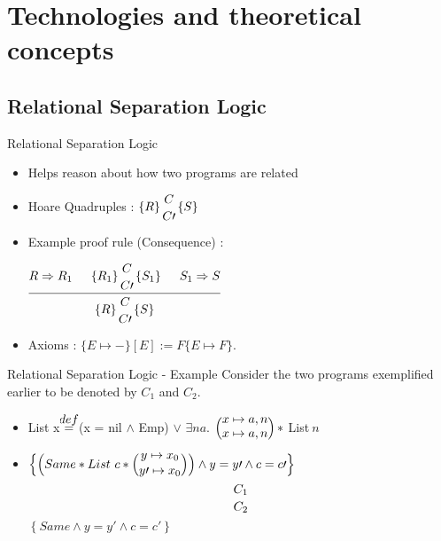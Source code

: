 \documentclass{beamer}
\newcommand{\rl}[2]{
	\let\scriptstyle\textstyle 
	\substack{{#1} \\ \\ 	\let\scriptstyle\textstyle {#2}} 
}
\newcommand{\hq}[4]{
	\left\{{#1}\right\}
	\rl{#2}{#3}
	\left\{{#4}\right\}
}
\newcommand{\defeq}{\stackrel{\mathclap{\normalfont{def}}}{=}}
\begin{document}
\section{Technologies and theoretical concepts}

\subsection{Relational Separation Logic}
\begin{frame}{Relational Separation Logic}
\begin{itemize}
	\item Helps reason about how two programs are related
	\item {Hoare Quadruples : \(\hq{R}{C}{C\prime}{S}\)}
	\item {Example proof rule (Consequence) : \begin{center}	\(
		\begin{prooftree}
		\Hypo{R \Rightarrow R_1}
		\Hypo{\hq{R_1}{C}{C\prime}{S_1}}
		\Hypo{S_1 \Rightarrow S}
		\Infer 3 {\hq{R}{C}{C\prime}{S}}
		\end{prooftree}	
		\)
		\end{center}
	}
	\item Axioms : \(
	\{E \mapsto -\} [E] := F \{E \mapsto F\}.
	\)
\end{itemize}
\end{frame}
\begin{frame}[fragile]{Relational Separation Logic - Example}
Consider the two programs exemplified earlier to be denoted by \(C_1\) and \(C_2\).
\begin{example}
	
	\begin{itemize}
		\item
		\textsf{List x \(\defeq\) (x = nil \(\land\) Emp) \(\lor \) 
			\(\exists na.\) 
			\(\left(\rl{x \mapsto a,n}{x \mapsto a,n}\right) *\) List\(\ n\) 
		}
		\item \(\left\{\left(Same * List\ c * \left(\rl{y \mapsto x_0}{y\prime \mapsto x_0}\right)\right) \land y = y\prime \land c = c\prime \right\}\)
		\\
		\[\rl{C_1}{C_2}\]
		\(\left\{Same \land y = y\prime \land c = c\prime\right\}\)
	\end{itemize}
\end{example}
\end{frame}
\end{document}
